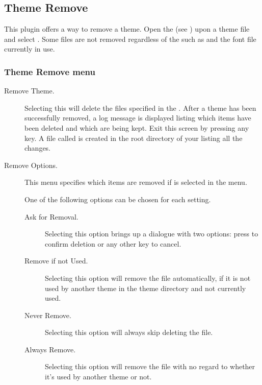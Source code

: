 \subsection{\label{ref:ThemeRemove}Theme Remove}
This plugin offers a way to remove a theme. Open the  (see ) 
upon a theme file and select .
Some files are not removed regardless of the  such as
 and the font file currently in use.

\subsubsection{Theme Remove menu}
\begin{description}
  \item[Remove Theme.]
  Selecting this will delete the files specified in the .
  After a theme has been successfully removed, a log message is displayed listing 
  which items have been deleted and which are being kept. Exit this screen by 
  pressing any key. A file called  is created in 
  the root directory of your \dap{} listing all the changes.

  \item[Remove Options.]
  This menu specifies which items are removed if
   is selected in the menu.

  One of the following options can be chosen for each setting.
  \begin{description}
    \item[Ask for Removal.]
    Selecting this option brings up a dialogue with two options:
    press \ActionYesNoAccept{} to confirm deletion or any other key to cancel.
    \item[Remove if not Used.]
    Selecting this option will remove the file automatically, if it is not 
    used by another theme in the theme directory and not currently used.
    \item[Never Remove.]
    Selecting this option will always skip deleting the file.
    \item[Always Remove.]
    Selecting this option will remove the file with no regard to
    whether it's used by another theme or not.
  \end{description}


\end{description}
